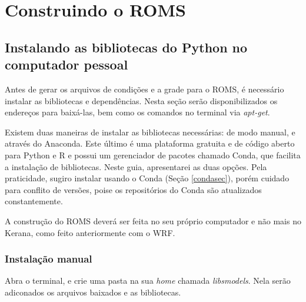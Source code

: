 \chapter{Construindo o ROMS}
\section{Instalando as bibliotecas do Python no computador pessoal}
\bigskip

\noindent Antes de gerar os arquivos de condições e a grade para o ROMS, é necessário instalar as bibliotecas e dependências. Nesta seção serão disponibilizados os endereços para baixá-las, bem como os comandos no terminal via \textit{apt-get}.
\bigskip

\noindent Existem duas maneiras de instalar as bibliotecas necessárias: de modo manual, e através do Anaconda. Este último é uma plataforma gratuita e de código aberto para Python e R e possui um gerenciador de pacotes chamado Conda, que facilita a instalação de bibliotecas. Neste guia, apresentarei as duas opções. Pela praticidade, sugiro instalar usando o Conda (Seção \textcolor{bleu_cite}{\ref{condasec}}), porém cuidado para conflito de versões, poise os repositórios do Conda são atualizados constantemente.
\bigskip

\begin{tcolorbox}[enhanced,
  grow to left by   = 0cm,
  grow to right by  = 0cm,
  enlarge top by    = 0cm,
  enlarge bottom by = 0cm,
  tcbox raise base,
  boxrule           = 1.0pt,
  left              = 18mm,
  colframe          = red!50!black,coltext=red!25!black,colback=red!10!white,
  overlay           = {\begin{tcbclipinterior}\fill[red!75!blue!50!white] (frame.south west)
    rectangle node[text=white,font=\sffamily\bfseries\footnotesize,rotate=0] {ATENÇÃO} ([xshift=18mm]frame.north west);\end{tcbclipinterior}}]
A construção do ROMS deverá ser feita no seu próprio computador e não mais no Kerana, como feito anteriormente com o WRF.
\end{tcolorbox}
\bigskip

\subsection{Instalação manual}
\bigskip
\noindent Abra o terminal, e crie uma pasta na sua \textit{home} chamada \textit{libsmodels}. Nela serão adiconados os arquivos baixados e as bibliotecas.
\bigskip

